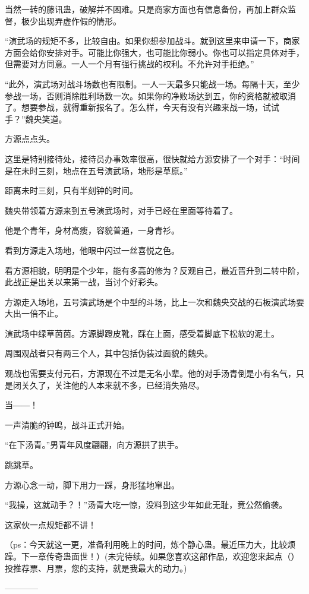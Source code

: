 \begin{this_body}
当然一转的藤讯蛊，破解并不困难。只是商家方面也有信息备份，再加上群众监督，极少出现弄虚作假的情形。

“演武场的规矩不多，比较自由。如果你想参加战斗。就到这里来申请一下，商家方面会给你安排对手。可能比你强大，也可能比你弱小。你也可以指定具体对手，但需要对方同意。一人一个月有强行挑战的权利。不允许对手拒绝。”

“此外，演武场对战斗场数也有限制。一人一天最多只能战一场。每隔十天，至少参战一场，否则消除胜利场数一次。如果你的净败场达到五，你的资格就被取消了。想要参战，就得重新报名了。怎么样，今天有没有兴趣来战一场，试试手？”魏央笑道。

方源点点头。

这里是特别接待处，接待员办事效率很高，很快就给方源安排了一个对手：“时间是在未时三刻，地点在五号演武场，地形是草原。”

距离未时三刻，只有半刻钟的时间。

魏央带领着方源来到五号演武场时，对手已经在里面等待着了。

他是个青年，身材高瘦，容貌普通，一身青衫。

看到方源走入场地，他眼中闪过一丝喜悦之色。

看方源相貌，明明是个少年，能有多高的修为？反观自己，最近晋升到二转中阶，此战正是出关以来第一战，当讨个好彩头。

方源走入场地，五号演武场是个中型的斗场，比上一次和魏央交战的石板演武场要大出一倍不止。

演武场中绿草茵茵。方源脚蹬皮靴，踩在上面，感受着脚底下松软的泥土。

周围观战者只有两三个人，其中包括伪装过面貌的魏央。

观战也需要支付元石，方源现在不过是无名小辈。他的对手汤青倒是小有名气，只是闭关久了，关注他的人本来就不多，已经消失殆尽。

当――！

一声清脆的钟鸣，战斗正式开始。

“在下汤青。”男青年风度翩翩，向方源拱了拱手。

跳跳草。

方源心念一动，脚下用力一踩，身形猛地窜出。

“我操，这就动手？！”汤青大吃一惊，没料到这少年如此无耻，竟公然偷袭。

这家伙一点规矩都不讲！

（ps：今天就这一更，准备利用晚上的时间，炼个静心蛊。最近压力大，比较烦躁。下一章传奇蛊面世！）(未完待续。如果您喜欢这部作品，欢迎您来起点（）投推荐票、月票，您的支持，就是我最大的动力。)

------------

\end{this_body}

